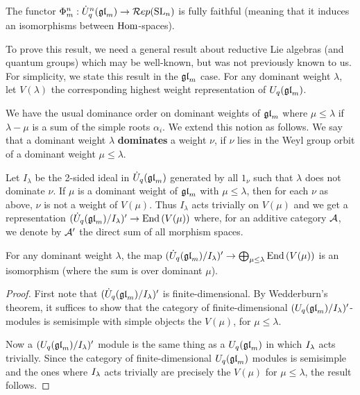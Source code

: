 \documentclass[11pt,leqno]{article}
\begin{document}
\begin{thm}\label{th:functorfullyfaithful}
The functor $\Phi_m^n: \dot{{{U}}}_q^n({\mathfrak{gl}}_m) \rightarrow \mathcal{R}ep({\rm{SL}}_n)$ is fully faithful (meaning that it induces an isomorphisms between $\operatorname{Hom}$-spaces).
\end{thm}

To prove this result, we need a general result about reductive Lie algebras (and quantum groups) which may be well-known, but was not previously known to us.   For simplicity, we state this result in the $ {\mathfrak{gl}}_m $ case.  For any dominant weight $ \lambda $, let $V(\lambda)$ the corresponding highest weight representation of $ U_q({\mathfrak{gl}}_m)$.

We have the usual dominance order on dominant weights of $ {\mathfrak{gl}}_m $ where $ \mu \le \lambda $ if $ \lambda - \mu $ is a sum of the simple roots $ \alpha_i $.  We extend this notion as follows.  We say that a dominant weight $ \lambda $ \textbf{dominates} a weight $ \nu $, if $ \nu $ lies in the Weyl group orbit of a dominant weight $ \mu \le \lambda $.

Let $ I_\lambda $ be the 2-sided ideal in $\dot{{{U}}}_q({\mathfrak{gl}}_m)$ generated by all $ 1_\nu $ such that $ \lambda $ does not dominate $ \nu $. If $ \mu $ is a dominant weight of $ {\mathfrak{gl}}_m $ with $ \mu \le \lambda $, then for each $ \nu $ as above, $ \nu $ is not a weight of $V(\mu)$.  Thus $ I_\lambda $ acts trivially on $ V(\mu) $ and we get a representation $ (\dot{{{U}}}_q({\mathfrak{gl}}_m)/I_\lambda)' \rightarrow \operatorname{End}\left(V(\mu)\right) $ where, for an additive category $\mathcal{A}$, we denote by $\mathcal{A}'$ the direct sum of all morphism spaces.




\begin{lem}
For any dominant weight $ \lambda $, the map $ (\dot{{{U}}}_q({\mathfrak{gl}}_m) / I_\lambda)' \rightarrow \bigoplus_{\mu \le \lambda} \operatorname{End}\left(V(\mu)\right)$ is an isomorphism (where the sum is over dominant $\mu$).
\end{lem}
\begin{proof}
First note that $(\dot{{{U}}}_q({\mathfrak{gl}}_m)/ I_\lambda)'$ is finite-dimensional. By Wedderburn's theorem, it suffices to show that the category of finite-dimensional $(U_q({\mathfrak{gl}}_m)/I_\lambda)'$-modules is semisimple with simple objects the $V(\mu)$, for $\mu \le \lambda$.

Now a $(U_q({\mathfrak{gl}}_m)/I_\lambda)'$ module is the same thing as a $U_q({\mathfrak{gl}}_m) $ in which $I_\lambda$ acts trivially. Since the category of finite-dimensional $U_q({\mathfrak{gl}}_m) $ modules is semisimple and the ones where $I_\lambda$ acts trivially are precisely the $ V(\mu) $ for $ \mu \le \lambda$, the result follows.
\end{proof}
\end{document}

